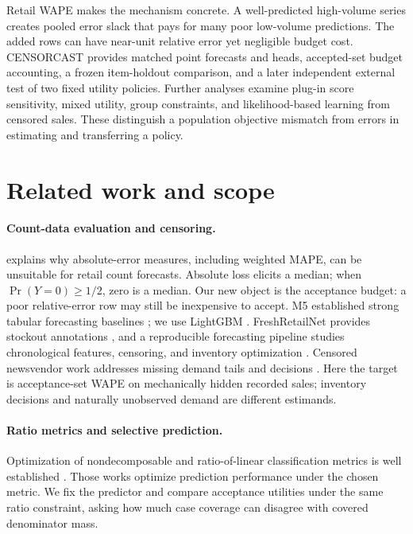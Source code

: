 \documentclass{article}
\begin{document}
Retail WAPE makes the mechanism concrete. A well-predicted high-volume series creates pooled error slack that pays for many poor low-volume predictions. The added rows can have near-unit relative error yet negligible budget cost. CENSORCAST provides matched point forecasts and heads, accepted-set budget accounting, a frozen item-holdout comparison, and a later independent external test of two fixed utility policies. Further analyses examine plug-in score sensitivity, mixed utility, group constraints, and likelihood-based learning from censored sales. These distinguish a population objective mismatch from errors in estimating and transferring a policy.

\section{Related work and scope}
\paragraph{Count-data evaluation and censoring.}
\citet{kolassa2016count} explains why absolute-error measures, including weighted MAPE, can be unsuitable for retail count forecasts. Absolute loss elicits a median; when $\Pr(Y=0)\geq1/2$, zero is a median. Our new object is the acceptance budget: a poor relative-error row may still be inexpensive to accept. M5 established strong tabular forecasting baselines \citep{makridakis2022m5}; we use LightGBM \citep{ke2017lightgbm}. FreshRetailNet provides stockout annotations \citep{wang2025fresh}, and a reproducible forecasting pipeline studies chronological features, censoring, and inventory optimization \citep{azar2026pipeline}. Censored newsvendor work addresses missing demand tails and decisions \citep{hssaine2024censored}. Here the target is acceptance-set WAPE on mechanically hidden recorded sales; inventory decisions and naturally unobserved demand are different estimands.

\paragraph{Ratio metrics and selective prediction.}
Optimization of nondecomposable and ratio-of-linear classification metrics is well established \citep{narasimhan2015complex,bao2020fractional}. Those works optimize prediction performance under the chosen metric. We fix the predictor and compare acceptance utilities under the same ratio constraint, asking how much case coverage can disagree with covered denominator mass.
\end{document}
